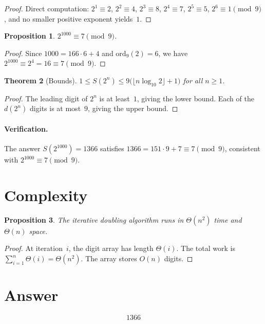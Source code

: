 \documentclass[12pt,a4paper]{article}
\newtheorem{theorem}{Theorem}
\newtheorem{proposition}[theorem]{Proposition}
\theoremstyle{definition}
\begin{document}
\begin{proof}
Direct computation: $2^1 \equiv 2$, $2^2 \equiv 4$, $2^3 \equiv 8$, $2^4 \equiv 7$,
$2^5 \equiv 5$, $2^6 \equiv 1 \pmod{9}$, and no smaller positive exponent yields~$1$.
\end{proof}

\begin{proposition}
$2^{1000} \equiv 7 \pmod{9}$.
\end{proposition}

\begin{proof}
Since $1000 = 166 \cdot 6 + 4$ and $\mathrm{ord}_9(2) = 6$, we have
$2^{1000} \equiv 2^4 = 16 \equiv 7 \pmod{9}$.
\end{proof}

\begin{theorem}[Bounds]
$1 \le S(2^n) \le 9\bigl(\lfloor n \log_{10} 2 \rfloor + 1\bigr)$ for all $n \ge 1$.
\end{theorem}

\begin{proof}
The leading digit of $2^n$ is at least~$1$, giving the lower bound. Each of the
$d(2^n)$ digits is at most~$9$, giving the upper bound.
\end{proof}

\paragraph{Verification.}
The answer $S(2^{1000}) = 1366$ satisfies $1366 = 151 \cdot 9 + 7 \equiv 7 \pmod{9}$,
consistent with $2^{1000} \equiv 7 \pmod{9}$.

\section{Complexity}

\begin{proposition}
The iterative doubling algorithm runs in $\Theta(n^2)$ time and $\Theta(n)$ space.
\end{proposition}

\begin{proof}
At iteration~$i$, the digit array has length $\Theta(i)$. The total work is
$\sum_{i=1}^{n} \Theta(i) = \Theta(n^2)$. The array stores $O(n)$ digits.
\end{proof}

\section{Answer}

\[
\boxed{1366}
\]
\end{document}
